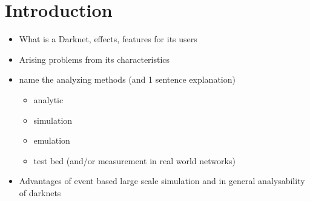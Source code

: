\chapter{Introduction}

\begin{itemize}
\item What is a Darknet, effects, features for its users
\item Arising problems from its characteristics
\item name the analyzing methods (and 1 sentence explanation) \begin{itemize}
\item analytic
\item simulation
\item emulation
\item test bed (and/or measurement in real world networks)
\end{itemize}
\item Advantages of event based large scale simulation and in general analysability of darknets
\end{itemize}
